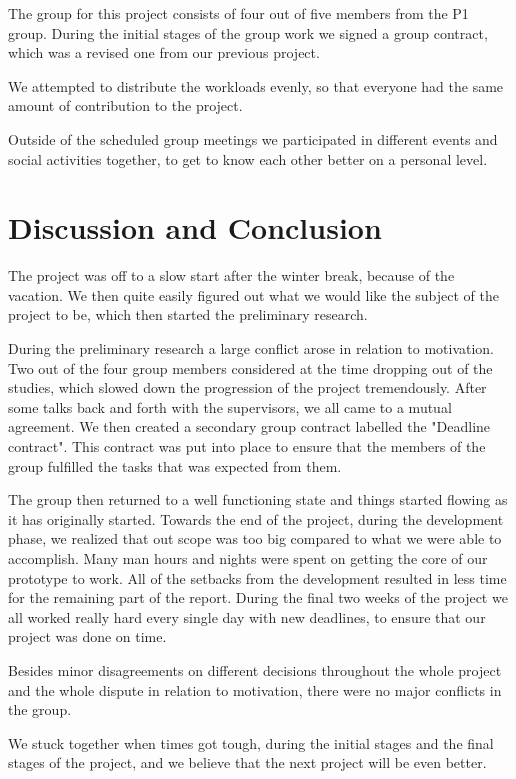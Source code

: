 The group for this project consists of four out of five members from the P1 group. During the initial stages of the group work we signed a group contract, which was a revised one from our previous project.

We attempted to distribute the workloads evenly, so that everyone had the same amount of contribution to the project.

Outside of the scheduled group meetings we participated in different events and social activities together, to get to know each other better on a personal level.

\section{Discussion and Conclusion}

The project was off to a slow start after the winter break, because of the vacation. We then quite easily figured out what we would like the subject of the project to be, which then started the preliminary research.

During the preliminary research a large conflict arose in relation to motivation. Two out of the four group members considered at the time dropping out of the studies, which slowed down the progression of the project tremendously. After some talks back and forth with the supervisors, we all came to a mutual agreement. We then created a secondary group contract labelled the "Deadline contract". This contract was put into place to ensure that the members of the group fulfilled the tasks that was expected from them.

The group then returned to a well functioning state and things started flowing as it has originally started. Towards the end of the project, during the development phase, we realized that out scope was too big compared to what we were able to accomplish. Many man hours and nights were spent on getting the core of our prototype to work. All of the setbacks from the development resulted in less time for the remaining part of the report. During the final two weeks of the project we all worked really hard every single day with new deadlines, to ensure that our project was done on time.

Besides minor disagreements on different decisions throughout the whole project and the whole dispute in relation to motivation, there were no major conflicts in the group.

We stuck together when times got tough, during the initial stages and the final stages of the project, and we believe that the next project will be even better.